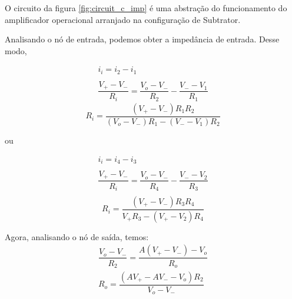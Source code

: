  O circuito da figura \ref{fig:circuit_c_imp} é uma abstração do funcionamento do amplificador operacional arranjado na configuração de Subtrator.
 
 Analisando o nó de entrada, podemos obter a impedância de entrada. Desse modo, 
 
\begin{gather*}
     i_i = i_2 - i_1\\ \\
     \dfrac{V_+ - V_-}{R_i} = \dfrac{V_o - V_-}{R_2} - \dfrac{V_- - V_1}{R_1}
\end{gather*}
\begin{equation}
         R_i = \dfrac{(V_+ - V_-)R_1 R_2}{(V_o - V_-)R_1 - (V_- - V_1)R_2}
\end{equation}
\begin{center}
    ou
\end{center}
\begin{gather*}
     i_i = i_4 - i_3\\
     \\
     \dfrac{V_+-V_-}{R_i} = \dfrac{V_o - V_-}{R_4} - \dfrac{V_- - V_2}{R_3}\\
\end{gather*}
\begin{equation}
         R_i = \dfrac{(V_+ - V_-)R_3 R_4}{V_+ R_3 - (V_+ - V_2)R_4}
\end{equation}

 Agora, analisando o nó de saída, temos:
\begin{gather*}
    \dfrac{V_o - V_-}{R_2} = \dfrac{A(V_+ - V_-) - V_o}{R_o}\\
    R_o = \dfrac{(AV_+ - AV_- -V_o)R_2}{V_o - V_-}
\end{gather*}

